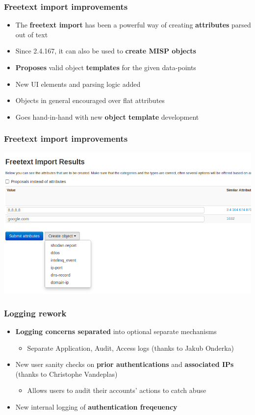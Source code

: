 \begin{frame}
  \frametitle{Freetext import improvements}
  \begin{itemize}
      \item The {\bf freetext import} has been a powerful way of creating {\bf attributes} parsed out of text
      \item Since 2.4.167, it can also be used to {\bf create MISP objects }
      \item {\bf Proposes} valid object {\bf templates} for the given data-points
      \item New UI elements and parsing logic added
      \item Objects in general encouraged over flat attributes
      \item Goes hand-in-hand with new {\bf object template} development
  \end{itemize}
\end{frame}

\begin{frame}
\frametitle{Freetext import improvements}
\begin{center}
\includegraphics[scale=0.40]{images/freetext_objects.png}
\end{center}
\end{frame}


\begin{frame}
  \frametitle{Logging rework}
  \begin{itemize}
     \item {\bf Logging concerns separated} into optional separate mechanisms
     \begin{itemize}
         \item Separate Application, Audit, Access logs (thanks to Jakub Onderka)
     \end{itemize}
     \item New user sanity checks on {\bf prior authentications} and {\bf associated IPs} (thanks to Christophe Vandeplas)
     \begin{itemize}
         \item Allows users to audit their accounts' actions to catch abuse
     \end{itemize}
     \item New internal logging of {\bf authentication freqeuency}
  \end{itemize}
\end{frame}

